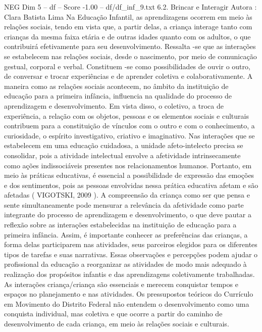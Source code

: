 \begin{textsample}{NEG Dim 5 – df – Score -1.00 – df/df\_inf\_9.txt}  \label{ex:f5_neg_134}
6.2.
Brincar e Interagir Autora : Clara Batista Lima Na Educação Infantil, as aprendizagens ocorrem em meio às relações sociais, tendo em vista que, a partir delas, a criança interage tanto com crianças da mesma faixa etária e de outras idades quanto com os adultos, o que contribuirá efetivamente para seu desenvolvimento.
Ressalta -se que as interações se estabelecem nas relações sociais, desde o nascimento, por meio de comunicação gestual, corporal e verbal.
Constituem -se como possibilidades de ouvir o outro, de conversar e trocar experiências e de aprender coletiva e colaborativamente.
A maneira como as relações sociais acontecem, no âmbito da instituição de educação para a primeira infância, influencia na qualidade do processo de aprendizagem e desenvolvimento.
Em vista disso, o coletivo, a troca de experiência, a relação com os objetos, pessoas e os elementos sociais e culturais contribuem para a constituição de vínculos com o outro e com o conhecimento, a curiosidade, o espírito investigativo, criativo e imaginativo.
Nas interações que se estabelecem em uma educação cuidadosa, a unidade afeto-intelecto precisa se consolidar, pois a atividade intelectual envolve a afetividade intrinsecamente como ações indissociáveis presentes nos relacionamentos humanos.
Portanto, em meio às práticas educativas, é essencial a possibilidade de expressão das emoções e dos sentimentos, pois as pessoas envolvidas nessa prática educativa afetam e são afetadas ( VIGOTSKI, 2009 ).
A compreensão da criança como ser que pensa e sente simultaneamente pode mensurar a relevância da afetividade como parte integrante do processo de aprendizagem e desenvolvimento, o que deve pautar a reflexão sobre as interações estabelecidas na instituição de educação para a primeira infância.
Assim, é importante conhecer as preferências das crianças, a forma delas participarem nas atividades, seus parceiros elegidos para os diferentes tipos de tarefas e suas narrativas.
Essas observações e percepções podem ajudar o profissional da educação a reorganizar as atividades de modo mais adequado à realização dos propósitos infantis e das aprendizagens coletivamente trabalhadas.
As interações criança/criança são essenciais e merecem conquistar tempos e espaços no planejamento e nas atividades.
Os pressupostos teóricos do Currículo em Movimento do Distrito Federal não entendem o desenvolvimento como uma conquista individual, mas coletiva e que ocorre a partir do caminho de desenvolvimento de cada criança, em meio às relações sociais e culturais.

\end{textsample}
